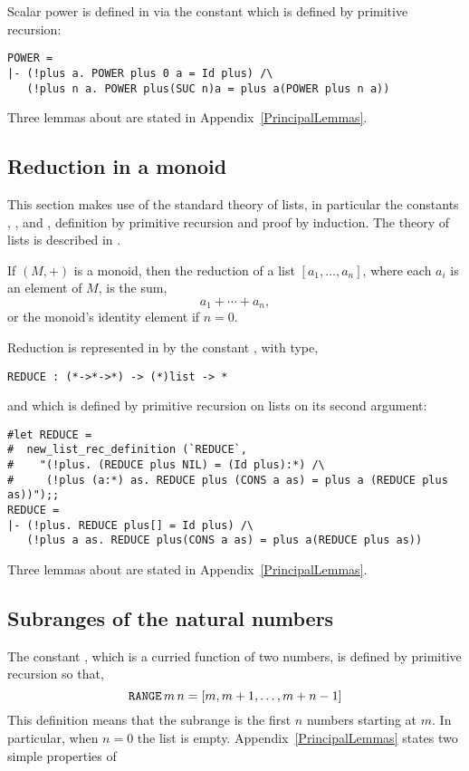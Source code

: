 Scalar power is defined in \HOL{} via the constant \verb@POWER@ which
is defined by primitive recursion:
\begin{session}
\begin{verbatim}
POWER = 
|- (!plus a. POWER plus 0 a = Id plus) /\
   (!plus n a. POWER plus(SUC n)a = plus a(POWER plus n a))
\end{verbatim}
\end{session}
Three lemmas about \verb@POWER@ are stated in Appendix~\ref{PrincipalLemmas}.

\subsection{Reduction in a monoid}

This section makes use of the standard \HOL{} theory of lists, in particular 
the constants \verb@NIL@, \verb@CONS@, \verb@APPEND@ and \verb@MAP@, 
definition by primitive recursion and proof by induction. The theory of 
lists is described in \DESCRIPTION.

If $(M,+)$ is a monoid, then the reduction of a list $[a_1,\ldots,a_n]$,
where each $a_i$ is an element of $M$, is the sum,
\[
a_1 + \cdots + a_n,
\]
or the monoid's identity element if $n=0$.

Reduction is represented in \HOL{} by the constant \verb@REDUCE@,
with type,
\begin{verbatim}
REDUCE : (*->*->*) -> (*)list -> *
\end{verbatim}
and which is defined by primitive recursion on lists on its second argument:
\begin{session}
\begin{verbatim}
#let REDUCE =
#  new_list_rec_definition (`REDUCE`,
#    "(!plus. (REDUCE plus NIL) = (Id plus):*) /\
#     (!plus (a:*) as. REDUCE plus (CONS a as) = plus a (REDUCE plus as))");;
REDUCE = 
|- (!plus. REDUCE plus[] = Id plus) /\
   (!plus a as. REDUCE plus(CONS a as) = plus a(REDUCE plus as))
\end{verbatim}
\end{session}
Three lemmas about \verb@REDUCE@ are stated in Appendix~\ref{PrincipalLemmas}.

\subsection{Subranges of the natural numbers}

The constant \verb@RANGE@, which is a curried function of two numbers,
is defined by primitive recursion so that,
\[
\verb@RANGE@\,m\,n = [m, m+1, \ldots, m+n-1]
\]
This definition means that the subrange is the first $n$ numbers starting 
at $m$.  In particular, when $n=0$ the list is empty.
Appendix~\ref{PrincipalLemmas} states two simple properties of \verb@RANGE@

